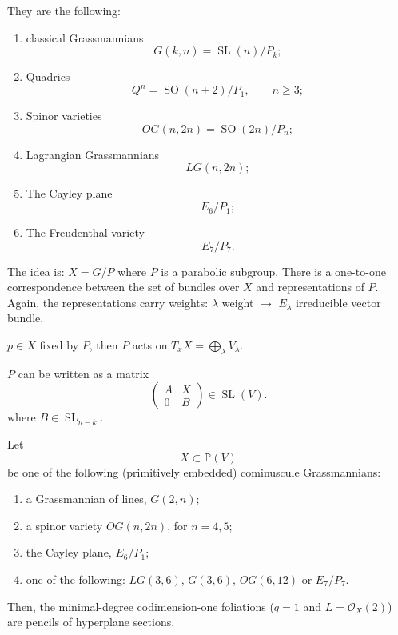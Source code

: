 They are the following:
\begin{enumerate}
\item classical Grassmannians
$$
G(k,n)=\operatorname{SL}(n)/P_k;
$$

\item Quadrics
$$
Q^n=\operatorname{SO}(n+2)/P_1,
\qquad n\geq 3;
$$

\item Spinor varieties
$$
OG(n,2n)=\operatorname{SO}(2n)/P_n;
$$

\item Lagrangian Grassmannians
$$
LG(n,2n);
$$

\item The Cayley plane
$$
E_6/P_1;
$$

\item The Freudenthal variety
$$
E_7/P_7.
$$
\end{enumerate}


The idea is: $X = G/P$ where $P$ is a
parabolic subgroup. There is a one-to-one
correspondence between the set of bundles
over $X$ and representations of $P$.
Again, the representations carry weights:
$\lambda$ weight $\to$ $E_\lambda$
irreducible vector bundle.


$p \in X$ fixed by $P$, then $P$ acts on
$T_xX = \bigoplus_\lambda V_\lambda$.

$P$ can be written as a matrix
$$
\begin{pmatrix}A&X\\ 0&B\end{pmatrix}
\in \operatorname{SL}(V).
$$
where $B \in \operatorname{SL}_{n-k}$.




\begin{theorem}
\label{theorem-minimal-degree-foliations}
Let
$$
X\subset\mathbb{P}(V)
$$
be one of the following (primitively
embedded) cominuscule Grassmannians:
\begin{enumerate}
\item a Grassmannian of lines, $G(2,n)$;

\item a spinor variety $OG(n,2n)$, for
$n=4,5$;

\item the Cayley plane, $E_6/P_1$;

\item one of the following:
$LG(3,6)$, $G(3,6)$, $OG(6,12)$ or
$E_7/P_7$.
\end{enumerate}

Then, the minimal-degree codimension-one
foliations ($q=1$ and
$L=\mathcal{O}_X(2)$) are pencils of
hyperplane sections.
\end{theorem}

